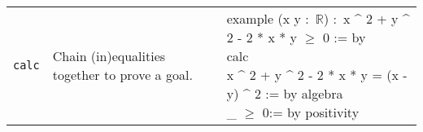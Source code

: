 \documentclass[10pt,landscape]{article}
\begin{document}
\begin{table}[h!]
\begin{tabularx}{\textwidth}{l p{10cm} X}
\midrule

\texttt{calc} & 
Chain (in)equalities together to prove a goal. &
\parbox{12cm}{\ttfamily\small
example (x y :\ $\mathbb{R}$) :\ x \^{} 2 + y \^{} 2 - 2 * x * y $\geq$ 0 := by\\
\hspace*{1em}calc\\
\hspace*{2em}x \^{} 2 + y \^{} 2 - 2 * x * y = (x - y) \^{} 2 := by algebra\\
\hspace*{15em}\_ $\geq$ 0\hspace*{4.4em}:= by positivity
} \\ 

\bottomrule
\end{tabularx}
\end{table}
\end{document}

